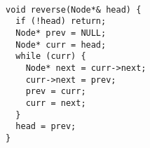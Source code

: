 \begin{verbatim}
               
void reverse(Node*& head) {
  if (!head) return;
  Node* prev = NULL;
  Node* curr = head;
  while (curr) {
    Node* next = curr->next;
    curr->next = prev;
    prev = curr;
    curr = next;
  }
  head = prev;
}
\end{verbatim}
